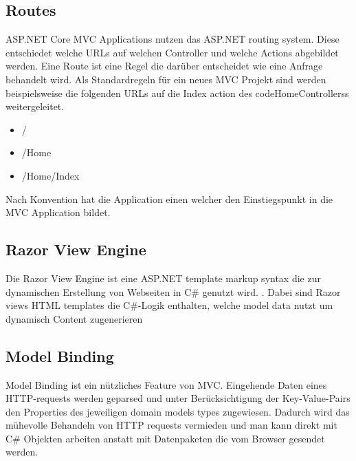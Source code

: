  
\subsection{Routes}

ASP.NET Core MVC Applications nutzen das ASP.NET routing system. Diese entschiedet welche URLs auf welchen Controller und welche Actions abgebildet werden. Eine Route ist eine Regel die darüber entscheidet wie eine Anfrage behandelt wird. Als Standardregeln für ein neues MVC Projekt sind werden beispielsweise die folgenden URLs auf die Index action des code{HomeControllers}s weitergeleitet.

\begin{itemize}

	\item /
	\item /Home
	\item /Home/Index

\end{itemize}

\noindent
Nach Konvention hat die Application einen  welcher den Einstiegspunkt in die MVC Application bildet.


\subsection{Razor View Engine}

Die Razor View Engine ist eine ASP.NET template markup syntax die zur dynamischen Erstellung von Webseiten in C\# genutzt wird. \cite{razorengine}. Dabei sind Razor views HTML templates die C\#-Logik enthalten, welche model data nutzt um dynamisch Content zugenerieren

\subsection{Model Binding}

Model Binding ist ein nützliches Feature von MVC. Eingehende Daten eines HTTP-requests werden geparsed und unter Berücksichtigung der Key-Value-Pairs den Properties des jeweiligen domain models types zugewiesen. Dadurch wird das mühevolle Behandeln von HTTP requests vermieden und man kann direkt mit C\# Objekten arbeiten anstatt mit Datenpaketen die vom Browser gesendet werden.


